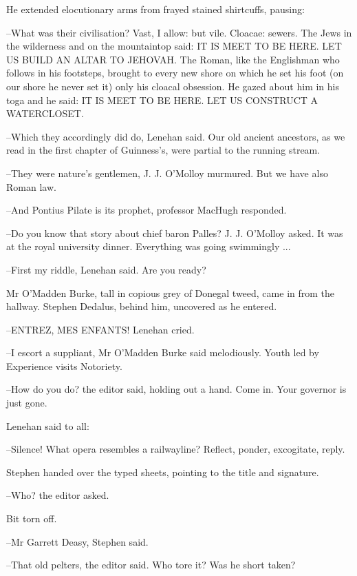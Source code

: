 He extended elocutionary arms from frayed stained shirtcuffs, pausing:

--What was their civilisation? Vast, I allow: but vile. Cloacae: sewers.
The Jews in the wilderness and on the mountaintop said: IT IS MEET TO BE
HERE. LET US BUILD AN ALTAR TO JEHOVAH. The Roman, like the Englishman who
follows in his footsteps, brought to every new shore on which he set his
foot (on our shore he never set it) only his cloacal obsession. He gazed
about him in his toga and he said: IT IS MEET TO BE HERE. LET US CONSTRUCT
A WATERCLOSET.

--Which they accordingly did do, Lenehan said. Our old ancient ancestors,
as we read in the first chapter of Guinness's, were partial to the running
stream.

--They were nature's gentlemen, J. J. O'Molloy murmured. But we have
also Roman law.

--And Pontius Pilate is its prophet, professor MacHugh responded.

--Do you know that story about chief baron Palles? J. J. O'Molloy asked.
It was at the royal university dinner. Everything was going
swimmingly ...

--First my riddle, Lenehan said. Are you ready?

Mr O'Madden Burke, tall in copious grey of Donegal tweed, came in
from the hallway. Stephen Dedalus, behind him, uncovered as he entered.

--ENTREZ, MES ENFANTS! Lenehan cried.

--I escort a suppliant, Mr O'Madden Burke said melodiously. Youth led by
Experience visits Notoriety.

--How do you do? the editor said, holding out a hand. Come in. Your
governor is just gone.



Lenehan said to all:

--Silence! What opera resembles a railwayline? Reflect, ponder,
excogitate, reply.

Stephen handed over the typed sheets, pointing to the title and signature.

--Who? the editor asked.

Bit torn off.

--Mr Garrett Deasy, Stephen said.

--That old pelters, the editor said. Who tore it? Was he short taken?



